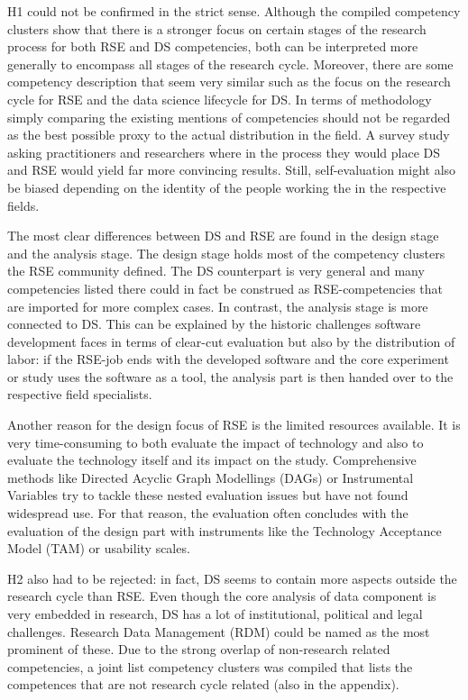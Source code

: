 \documentclass[
        english,biblatex
    ]{lni}
\begin{document}
    H1 could not be confirmed in the strict sense. Although the compiled
    competency clusters show that there is a stronger focus on certain
    stages of the research process for both RSE and DS competencies,
    both can be interpreted more generally to encompass all stages of
    the research cycle. Moreover, there are some competency description
    that seem very similar such as the focus on the research cycle for
    RSE and the data science lifecycle for DS. In terms of methodology
    simply comparing the existing mentions of competencies should not be
    regarded as the best possible proxy to the actual distribution in
    the field. A survey study asking practitioners and researchers where
    in the process they would place DS and RSE would yield far more
    convincing results. Still, self-evaluation might also be biased
    depending on the identity of the people working the in the
    respective fields.

    The most clear differences between DS and RSE are found in the
    design stage and the analysis stage. The design stage holds most of
    the competency clusters the RSE community defined. The DS
    counterpart is very general and many competencies listed there could
    in fact be construed as RSE-competencies that are imported for more
    complex cases. In contrast, the analysis stage is more connected to
    DS. This can be explained by the historic challenges software
    development faces in terms of clear-cut evaluation but also by the
    distribution of labor: if the RSE-job ends with the developed
    software and the core experiment or study uses the software as a
    tool, the analysis part is then handed over to the respective field
    specialists.

    Another reason for the design focus of RSE is the limited resources
    available. It is very time-consuming to both evaluate the impact of
    technology and also to evaluate the technology itself and its impact
    on the study. Comprehensive methods like Directed Acyclic Graph
    Modellings (DAGs) or Instrumental Variables try to tackle these
    nested evaluation issues but have not found widespread use. For that
    reason, the evaluation often concludes with the evaluation of the
    design part with instruments like the Technology Acceptance Model
    (TAM) or usability scales.

    H2 also had to be rejected: in fact, DS seems to contain more
    aspects outside the research cycle than RSE. Even though the core
    analysis of data component is very embedded in research, DS has a
    lot of institutional, political and legal challenges. Research Data
    Management (RDM) could be named as the most prominent of these. Due
    to the strong overlap of non-research related competencies, a joint
    list competency clusters was compiled that lists the competences
    that are not research cycle related (also in the appendix).
\end{document}

